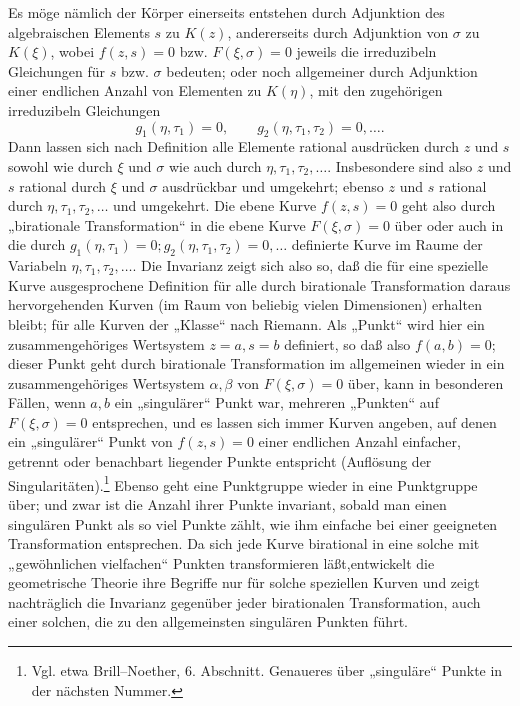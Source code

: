 \documentclass[11pt]{article}
\begin{document}
Es möge nämlich der Körper einerseits entstehen durch Adjunktion des algebraischen Elements \(s\) zu \(K(z)\), andererseits durch Adjunktion von \(\sigma\) zu \(K(\xi)\), wobei \(f(z,s)=0\) bzw. \(F(\xi,\sigma)=0\) jeweils die irreduzibeln Gleichungen für \(s\) bzw. \(\sigma\) bedeuten; oder noch allgemeiner durch Adjunktion einer endlichen Anzahl von Elementen zu \(K(\eta)\), mit den zugehörigen irreduzibeln Gleichungen
\[
g_1(\eta,\tau_1)=0,\qquad g_2(\eta,\tau_1,\tau_2)=0,\ldots .
\]
Dann lassen sich nach Definition alle Elemente rational ausdrücken durch \(z\) und \(s\) sowohl wie durch \(\xi\) und \(\sigma\) wie auch durch \(\eta,\tau_1,\tau_2,\ldots\). Insbesondere sind also \(z\) und \(s\) rational durch \(\xi\) und \(\sigma\) ausdrückbar und umgekehrt; ebenso \(z\) und \(s\) rational durch \(\eta,\tau_1,\tau_2,\ldots\) und umgekehrt. Die ebene Kurve \(f(z,s)=0\) geht also durch „birationale Transformation“ in die ebene Kurve \(F(\xi,\sigma)=0\) über oder auch in die durch \(g_1(\eta,\tau_1)=0; g_2(\eta,\tau_1,\tau_2)=0,\ldots\) definierte Kurve im Raume der Variabeln \(\eta,\tau_1,\tau_2,\ldots\). Die Invarianz zeigt sich also so, daß die für eine spezielle Kurve ausgesprochene Definition für alle durch birationale Transformation daraus hervorgehenden Kurven (im Raum von beliebig vielen Dimensionen) erhalten bleibt; für alle Kurven der „Klasse“ nach Riemann. Als „Punkt“ wird hier ein zusammengehöriges Wertsystem \(z=a,s=b\) definiert, so daß also \(f(a,b)=0\); dieser Punkt geht durch birationale Transformation im allgemeinen wieder in ein zusammengehöriges Wertsystem \(\alpha,\beta\) von \(F(\xi,\sigma)=0\) über, kann in besonderen Fällen, wenn \(a,b\) ein „singulärer“ Punkt war, mehreren „Punkten“ auf \(F(\xi,\sigma)=0\) entsprechen, und es lassen sich immer Kurven angeben, auf denen ein „singulärer“ Punkt von \(f(z,s)=0\) einer endlichen Anzahl einfacher, getrennt oder benachbart liegender Punkte entspricht (Auflösung der Singularitäten).\footnote{Vgl. etwa Brill--Noether, 6. Abschnitt. Genaueres über „singuläre“ Punkte in der nächsten Nummer.} Ebenso geht eine Punktgruppe wieder in eine Punktgruppe über; und zwar ist die Anzahl ihrer Punkte invariant, sobald man einen singulären Punkt als so viel Punkte zählt, wie ihm einfache bei einer geeigneten Transformation entsprechen. Da sich jede Kurve birational in eine solche mit „gewöhnlichen vielfachen“ Punkten transformieren läßt,\footnotemark[\value{footnote}] entwickelt die geometrische Theorie ihre Begriffe nur für solche speziellen Kurven und zeigt nachträglich die Invarianz gegenüber jeder birationalen Transformation, auch einer solchen, die zu den allgemeinsten singulären Punkten führt.
\end{document}
